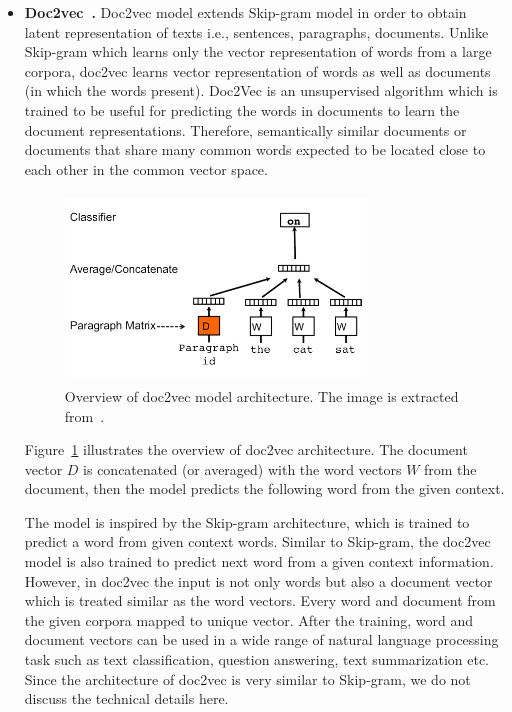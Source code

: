 \begin{itemize}
\item \textbf{Doc2vec~\cite{DBLP:conf/icml/LeM14}.}
Doc2vec model extends Skip-gram model in order to obtain latent representation of texts  i.e., sentences, paragraphs, documents. Unlike Skip-gram which learns only the vector representation of words from a large corpora, doc2vec learns vector representation of words as well as documents (in which the words present). Doc2Vec is an unsupervised algorithm which is trained to be useful for predicting the words in documents to learn the document representations. Therefore, semantically similar documents or documents that share many common words expected to be located close to each other in the common vector space. 
\begin{figure}[h]
\centering
 \includegraphics[height=5cm,width=8cm]{Figures/fig_doc2vec.png}
 \caption{Overview of doc2vec model architecture. The image is extracted from~\protect\cite{DBLP:conf/icml/LeM14}.}
 \label{fig:doc2vec}
\end{figure} 
Figure~\ref{fig:doc2vec} illustrates the overview of doc2vec architecture. The document vector $D$ is concatenated (or averaged) with the word vectors $W$ from the document, then the model predicts the following word from the given context.

The model is inspired by the Skip-gram architecture, which is trained to predict a word from given context words. Similar to Skip-gram, the doc2vec model is also trained to predict next word from a given context information. However, in doc2vec the input is not only words but also a document vector which is treated similar as the word vectors. Every word and document from the given corpora mapped to unique vector. After the training, word and document vectors can be used in a wide range of natural language processing task such as text classification, question answering, text summarization etc. Since the architecture of doc2vec is very similar to Skip-gram, we do not discuss the technical details here. \\   


\end{itemize}
